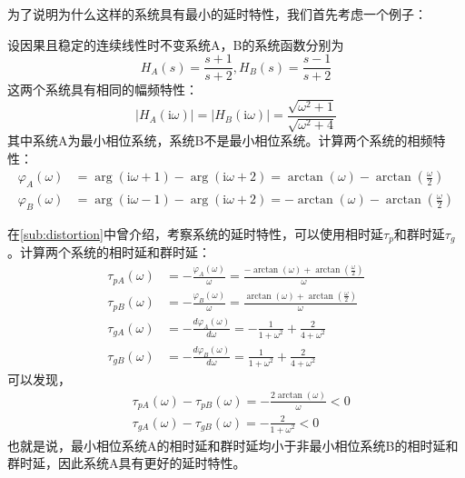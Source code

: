 为了说明为什么这样的系统具有最小的延时特性，我们首先考虑一个例子：
\begin{example}
    设因果且稳定的连续线性时不变系统A，B的系统函数分别为
    \[H_A(s)=\frac{s+1}{s+2},H_B(s)=\frac{s-1}{s+2}\]
    这两个系统具有相同的幅频特性：
    \[|H_A(\mathrm{i}\omega)|=|H_B(\mathrm{i}\omega)|=\frac{\sqrt{\omega^2+1}}{\sqrt{\omega^2+4}}\]
    其中系统A为最小相位系统，系统B不是最小相位系统。计算两个系统的相频特性：
    \begin{align*}
        \varphi_A(\omega)&=\arg(\mathrm{i}\omega+1)-\arg(\mathrm{i}\omega+2)=\arctan(\omega)-\arctan\left(\frac{\omega}{2}\right)\\
        \varphi_B(\omega)&=\arg(\mathrm{i}\omega-1)-\arg(\mathrm{i}\omega+2)=-\arctan(\omega)-\arctan\left(\frac{\omega}{2}\right)
    \end{align*}

    在\ref{sub:distortion}中曾介绍，考察系统的延时特性，可以使用相时延$\tau_p$和群时延$\tau_g$。计算两个系统的相时延和群时延：
    \begin{align*}
        \tau_{pA}(\omega)&=-\frac{\varphi_A(\omega)}{\omega}=\frac{-\arctan(\omega)+\arctan\left(\frac{\omega}{2}\right)}{\omega}\\
        \tau_{pB}(\omega)&=-\frac{\varphi_B(\omega)}{\omega}=\frac{\arctan(\omega)+\arctan\left(\frac{\omega}{2}\right)}{\omega}\\
        \tau_{gA}(\omega)&=-\frac{d\varphi_A(\omega)}{d\omega}=-\frac{1}{1+\omega^2}+\frac{2}{4+\omega^2}\\
        \tau_{gB}(\omega)&=-\frac{d\varphi_B(\omega)}{d\omega}=\frac{1}{1+\omega^2}+\frac{2}{4+\omega^2}
    \end{align*}
    可以发现，
    \begin{align*}
        &\tau_{pA}(\omega)-\tau_{pB}(\omega)=-\frac{2\arctan(\omega)}{\omega}<0\\
        &\tau_{gA}(\omega)-\tau_{gB}(\omega)=-\frac{2}{1+\omega^2}<0
    \end{align*}
    也就是说，最小相位系统A的相时延和群时延均小于非最小相位系统B的相时延和群时延，因此系统A具有更好的延时特性。
\end{example}

